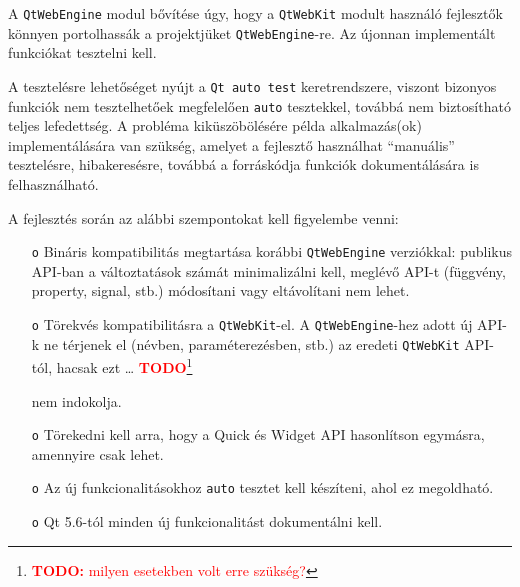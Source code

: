 \documentclass[12pt]{report}
\newcommand{\todo}[1]{%
    \textcolor{red}{\textbf{TODO}}\footnote{\textcolor{red}{\textbf{TODO:} #1}}
}
\begin{document}
\noindent
A \texttt{QtWebEngine} modul bővítése úgy, hogy a \texttt{QtWebKit} modult használó
fejlesztők könnyen portolhassák a projektjüket \texttt{QtWebEngine}-re. Az újonnan
implementált funkciókat tesztelni kell.

\bigskip
\noindent
A tesztelésre lehetőséget nyújt a \texttt{Qt auto test}
keretrendszere, viszont bizonyos funkciók nem tesztelhetőek megfelelően \texttt{auto}
tesztekkel, továbbá nem biztosítható teljes lefedettség. A probléma kiküszöbölésére
példa alkalmazás(ok) implementálására van szükség, amelyet a fejlesztő használhat
``manuális'' tesztelésre, hibakeresésre, továbbá a forráskódja funkciók dokumentálására is
felhasználható.

\bigskip
\noindent
A fejlesztés során az alábbi szempontokat kell figyelembe venni:
\begin{itemize}
    \item[\texttt{o}] Bináris kompatibilitás megtartása korábbi \texttt{QtWebEngine}
        verziókkal: publikus API-ban a változtatások számát minimalizálni kell,
        meglévő API-t (függvény, \\
        property, signal, stb.) módosítani vagy eltávolítani
        nem lehet.
    \item[\texttt{o}] Törekvés kompatibilitásra a \texttt{QtWebKit}-el.
        A \texttt{QtWebEngine}-hez adott új \mbox{API-k} ne térjenek el
        (névben, paraméterezésben, stb.) az eredeti \texttt{QtWebKit} API-tól, hacsak ezt
        \dots \todo{milyen esetekben volt erre szükség?}
        nem indokolja.
    \item[\texttt{o}] Törekedni kell arra, hogy a Quick és Widget API hasonlítson egymásra,
        amennyire csak lehet.
    \item[\texttt{o}] Az új funkcionalitásokhoz \texttt{auto} tesztet kell készíteni,
        ahol ez megoldható.
    \item[\texttt{o}] Qt 5.6-tól minden új funkcionalitást dokumentálni kell.
\end{itemize}
\end{document}
